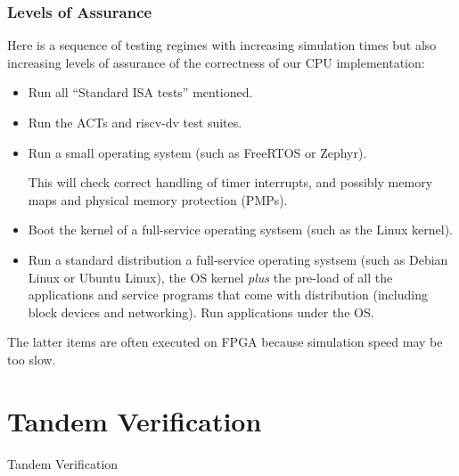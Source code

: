 
\begin{frame}[fragile]
\frametitle{Levels of Assurance}

\footnotesize

Here is a sequence of testing regimes with increasing simulation times
but also increasing levels of assurance of the correctness of our CPU
implementation:

\vxx

\begin{itemize}
 \item Run all ``Standard ISA tests'' mentioned.

 \item Run the ACTs and riscv-dv test suites.

 \item Run a small operating system (such as FreeRTOS or Zephyr).

       This will check correct handling of timer interrupts, and
       possibly memory maps and physical memory protection (PMPs).

 \item Boot the kernel of a full-service operating systsem (such as the Linux kernel).

 \item Run a standard distribution a full-service operating systsem
       (such as Debian Linux or Ubuntu Linux), {\ie} the OS kernel
       \emph{plus} the pre-load of all the applications and service
       programs that come with distribution (including block devices
       and networking).  Run applications under the OS.

\end{itemize}

\vxx

The latter items are often executed on FPGA because simulation speed may be too slow.

\end{frame}


\section{Tandem Verification}

\begin{frame}

\begin{center}
  {\LARGE Tandem Verification}
\end{center}

\end{frame}

